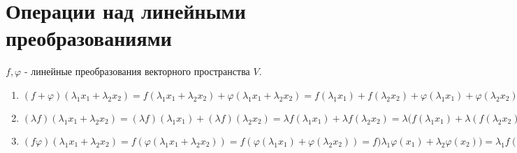 \documentclass[a4paper, 12pt]{report}
\begin{document}
\section{Операции над линейными преобразованиями}
$f, \varphi$ - линейные преобразования векторного пространства $V$.
\begin{enumerate}
    \item $(f+\varphi)(\lambda_1 x_1 + \lambda_2 x_2)=f(\lambda_1 x_1 + \lambda_2 x_2) + \varphi(\lambda_1 x_1 + \lambda_2 x_2)=f(\lambda_1 x_1) + f(\lambda_2 x_2) + \varphi(\lambda_1 x_1) + \varphi(\lambda_2 x_2) = \lambda_1f(x_1)+\lambda_2f(x_2)+\lambda_1\varphi(x_1)+\lambda_2\varphi(x_2)=\lambda_1(f(x_1)+\varphi(x_1))+\lambda_2(f(x_2)+\varphi(x_2))=\lambda_1(f+\varphi)(x_1)+\lambda(f+\varphi)(x_2)$
    \item $(\lambda f)(\lambda_1 x_1 + \lambda_2 x_2)=(\lambda f)(\lambda_1 x_1)+(\lambda f)(\lambda_2 x_2)=\lambda f(\lambda_1 x_1)+\lambda f(\lambda_2 x_2)=\lambda(f(\lambda_1 x_1)+\lambda(f(\lambda_2 x_2))=\lambda f(\lambda_1x_1+\lambda_2x_2)$
    \item $(f\varphi)(\lambda_1x_1+\lambda_2x_2)=f(\varphi(\lambda_1x_1+\lambda_2x_2))=f(\varphi(\lambda_1x_1)+\varphi(\lambda_2x_2))=f)\lambda_1\varphi(x_1)+\lambda_2\varphi(x_2))=\lambda_1f(\varphi(x_1))+\lambda_2f(\varphi(x_2))=\lambda_1(f\varphi)(x_1)+\lambda_2(f\varphi)(x_2)$
\end{enumerate}
\end{document}
